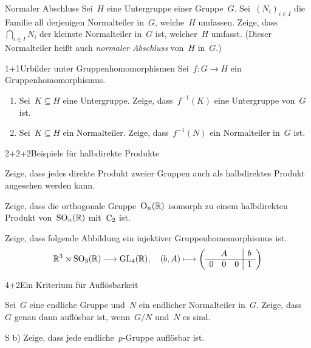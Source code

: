 \documentclass{algblatt}
\begin{document}

\begin{aufgabe}{2}{Normaler Abschluss}
Sei~$H$ eine Untergruppe einer Gruppe~$G$. Sei~$(N_i)_{i \in I}$ die Familie
all derjenigen Normalteiler in~$G$, welche~$H$ umfassen. Zeige,
dass~$\bigcap_{i \in I} N_i$ der kleinste Normalteiler in~$G$ ist, welcher~$H$
umfasst. (Dieser Normalteiler heißt auch \emph{normaler Abschluss} von~$H$
in~$G.$)
\end{aufgabe}

\begin{aufgabe}{1+1}{Urbilder unter Gruppenhomomorphismen}
Sei~$f : G \to H$ ein Gruppenhomomorphismus.
\begin{enumerate}
\item Sei~$K \subseteq H$ eine Untergruppe. Zeige, dass~$f^{-1}(K)$
eine Untergruppe von~$G$ ist.
\item Sei~$K \subseteq H$ ein Normalteiler. Zeige, dass~$f^{-1}(N)$
ein Normalteiler in~$G$ ist.
\end{enumerate}
\end{aufgabe}

\begin{aufgabeE}{2+2+2}{Beispiele für halbdirekte Produkte}
\item Zeige, dass jedes direkte Produkt zweier Gruppen auch als halbdirektes
Produkt angesehen werden kann.
\item Zeige, dass die orthogonale Gruppe~$\mathrm{O}_n(\mathbb{R})$ isomorph zu einem
halbdirekten Produkt von~$\mathrm{SO}_n(\mathbb{R})$ mit~$\mathrm{C}_2$ ist.
\item Zeige, dass folgende Abbildung ein injektiver Gruppenhomomorphismus ist.
\[ \RR^3 \rtimes \SO_3(\RR) \longrightarrow \GL_4(\RR),\quad
  (b, A) \longmapsto \left(\begin{array}{ccc|c}
    \multicolumn{3}{c|}{A} & b \\\hline
    0 & 0 & 0 & 1
  \end{array}\right) \]
\end{aufgabeE}
\vspace{-1em}

\begin{aufgabeE}{4+2}{Ein Kriterium für Auflösbarkeit}
\item Sei~$G$ eine endliche Gruppe und~$N$ ein endlicher Normalteiler in~$G$.
Zeige, dass~$G$ genau dann auflösbar ist, wenn~$G/N$ und~$N$ es sind.
\item[S b)] Zeige, dass jede endliche~$p$-Gruppe auflösbar ist.
\end{aufgabeE}
\end{document}
